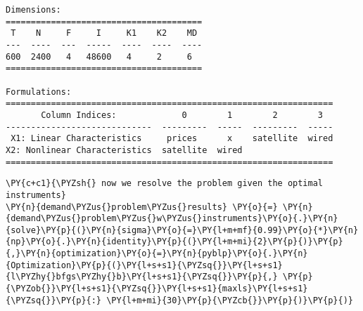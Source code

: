 \begin{Verbatim}[commandchars=\\\{\}]
Dimensions:
=======================================
 T    N     F     I     K1    K2    MD
---  ----  ---  -----  ----  ----  ----
600  2400   4   48600   4     2     6
=======================================

Formulations:
=================================================================
       Column Indices:             0        1        2        3
-----------------------------  ---------  -----  ---------  -----
 X1: Linear Characteristics     prices      x    satellite  wired
X2: Nonlinear Characteristics  satellite  wired
=================================================================
    \end{Verbatim}

    \begin{tcolorbox}[breakable, size=fbox, boxrule=1pt, pad at break*=1mm,colback=cellbackground, colframe=cellborder]
\begin{Verbatim}[commandchars=\\\{\}]
\PY{c+c1}{\PYZsh{} now we resolve the problem given the optimal instruments}
\PY{n}{demand\PYZus{}problem\PYZus{}results} \PY{o}{=} \PY{n}{demand\PYZus{}problem\PYZus{}w\PYZus{}instruments}\PY{o}{.}\PY{n}{solve}\PY{p}{(}\PY{n}{sigma}\PY{o}{=}\PY{l+m+mf}{0.99}\PY{o}{*}\PY{n}{np}\PY{o}{.}\PY{n}{identity}\PY{p}{(}\PY{l+m+mi}{2}\PY{p}{)}\PY{p}{,}\PY{n}{optimization}\PY{o}{=}\PY{n}{pyblp}\PY{o}{.}\PY{n}{Optimization}\PY{p}{(}\PY{l+s+s1}{\PYZsq{}}\PY{l+s+s1}{l\PYZhy{}bfgs\PYZhy{}b}\PY{l+s+s1}{\PYZsq{}}\PY{p}{,} \PY{p}{\PYZob{}}\PY{l+s+s1}{\PYZsq{}}\PY{l+s+s1}{maxls}\PY{l+s+s1}{\PYZsq{}}\PY{p}{:} \PY{l+m+mi}{30}\PY{p}{\PYZcb{}}\PY{p}{)}\PY{p}{)}
\end{Verbatim}
\end{tcolorbox}

